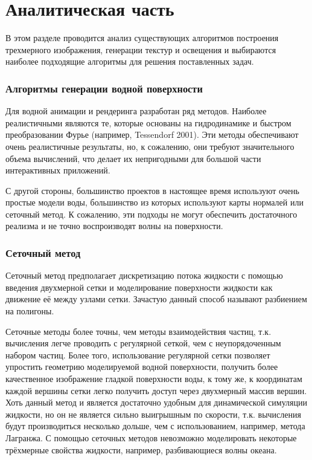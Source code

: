 \chapter{Аналитическая часть}


В этом разделе проводится анализ существующих алгоритмов построения трехмерного изображения, генерации текстур и освещения и выбираются наиболее подходящие алгоритмы для решения поставленных задач.


\subsection{Алгоритмы генерации водной поверхности}

Для водной анимации и рендеринга разработан ряд методов. Наиболее реалистичными являются те, которые основаны на гидродинамике и быстром преобразовании Фурье (например, Tessendorf 2001). Эти методы обеспечивают очень реалистичные результаты, но, к сожалению, они требуют значительного объема вычислений, что делает их непригодными для большой части интерактивных приложений.

С другой стороны, большинство проектов в настоящее время используют очень простые модели воды, большинство из которых используют карты нормалей или сеточный метод. К сожалению, эти подходы не могут обеспечить достаточного реализма и не точно воспроизводят волны на поверхности.

\subsection*{Сеточный метод}

Сеточный метод предполагает дискретизацию потока жидкости с помощью введения двухмерной сетки и моделирование поверхности жидкости как движение её между узлами сетки. Зачастую данный способ называют разбиением на полигоны.

Сеточные методы более точны, чем методы взаимодействия частиц, т.к. вычисления легче проводить с регулярной сеткой, чем с неупорядоченным набором частиц. Более того, использование регулярной сетки позволяет упростить геометрию моделируемой водной поверхности, получить более качественное изображение гладкой поверхности воды, к тому же, к координатам каждой вершины сетки легко получить доступ через двухмерный массив вершин. Хоть данный метод и является достаточно удобным для динамической симуляции жидкости, но он не является сильно выигрышным по скорости, т.к. вычисления будут производиться несколько дольше, чем с использованием, например, метода Лагранжа. С помощью сеточных методов невозможно моделировать некоторые трёхмерные свойства жидкости, например, разбивающиеся волны океана. 

